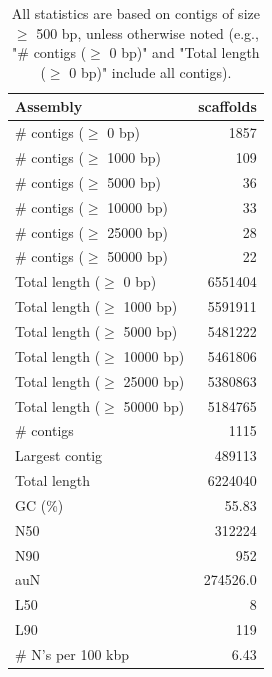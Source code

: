 \documentclass[12pt,a4paper]{article}
\begin{document}
\begin{table}[ht]
\begin{center}
\caption{All statistics are based on contigs of size $\geq$ 500 bp, unless otherwise noted (e.g., "\# contigs ($\geq$ 0 bp)" and "Total length ($\geq$ 0 bp)" include all contigs).}
\begin{tabular}{|l*{1}{|r}|}
\hline
Assembly & scaffolds \\ \hline
\# contigs ($\geq$ 0 bp) & 1857 \\ \hline
\# contigs ($\geq$ 1000 bp) & 109 \\ \hline
\# contigs ($\geq$ 5000 bp) & 36 \\ \hline
\# contigs ($\geq$ 10000 bp) & 33 \\ \hline
\# contigs ($\geq$ 25000 bp) & 28 \\ \hline
\# contigs ($\geq$ 50000 bp) & 22 \\ \hline
Total length ($\geq$ 0 bp) & 6551404 \\ \hline
Total length ($\geq$ 1000 bp) & 5591911 \\ \hline
Total length ($\geq$ 5000 bp) & 5481222 \\ \hline
Total length ($\geq$ 10000 bp) & 5461806 \\ \hline
Total length ($\geq$ 25000 bp) & 5380863 \\ \hline
Total length ($\geq$ 50000 bp) & 5184765 \\ \hline
\# contigs & 1115 \\ \hline
Largest contig & 489113 \\ \hline
Total length & 6224040 \\ \hline
GC (\%) & 55.83 \\ \hline
N50 & 312224 \\ \hline
N90 & 952 \\ \hline
auN & 274526.0 \\ \hline
L50 & 8 \\ \hline
L90 & 119 \\ \hline
\# N's per 100 kbp & 6.43 \\ \hline
\end{tabular}
\end{center}
\end{table}
\end{document}
